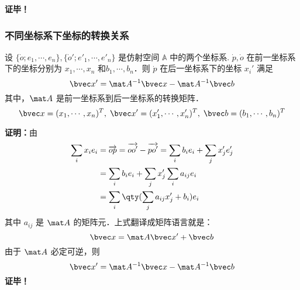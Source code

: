 \textbf{证毕！}
\subsubsection{不同坐标系下坐标的转换关系}
\begin{theorem}{}
设 $\{\dot o;e_1,\cdots,e_n\},\{\dot o';e'_1,\cdots,e'_n\}$ 是仿射空间 $\mathbb A$ 中的两个坐标系. $\dot p,\dot o$ 在前一坐标系下的坐标分别为 $x_1,\cdots,x_n$ 和$b_1,\cdots,b_n$．则 $\dot p$ 在后一坐标系下的坐标 $x_i'$ 满足
\begin{equation}
\bvec x'=\mat A^{-1}\bvec x-\mat A^{-1}\bvec b
\end{equation}
 其中，$\mat A$ 是前一坐标系到后一坐标系的转换矩阵．
 \begin{equation}
 \bvec x=(x_1,\cdots,x_n)^T,\;\bvec x'=(x_1',\cdots,x_n')^T,\;\bvec b=(b_1,\cdots,b_n)^T
 \end{equation}
 
\end{theorem}
\textbf{证明：}由
\begin{equation}
\begin{aligned}
\sum_{i}x_ie_i&=\overrightarrow{op}=\overrightarrow{oo'}-\overrightarrow{po'}=\sum_{i}b_ie_i+\sum_{j}x'_je'_j\\
&=\sum_i b_ie_i+\sum_{j}x'_j\sum_{i}a_{ij}e_i\\
&=\sum_{i}\qty(\sum_{j}a_{ij}x_j'+b_i)e_i
\end{aligned}
\end{equation}
其中 $a_{ij}$ 是 $\mat A$ 的矩阵元．上式翻译成矩阵语言就是：
\begin{equation}
\bvec x=\mat A\bvec x'+\bvec b
\end{equation}
由于 $\mat A$ 必定可逆，则
\begin{equation}
\bvec x'=\mat A^{-1}\bvec x-\mat A^{-1}\bvec b
\end{equation}
\textbf{证毕！}

